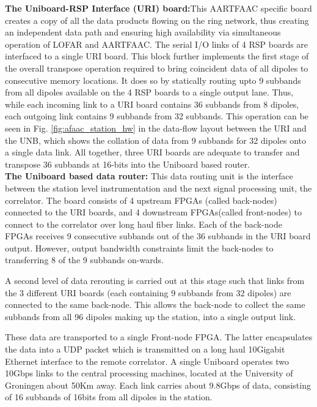 \documentclass{ws-jai}
\begin{document}
\noindent  \textbf  {The  Uniboard-RSP   Interface  (URI)  board:}This  AARTFAAC
specific board  creates a  copy of  all the  data products  flowing on  the ring
network, thus creating  an independent data path and  ensuring high availability
via simultaneous operation of LOFAR and AARTFAAC.  The serial I/O links of 4 RSP
boards are interfaced to a single  URI board.  This block further implements the
first stage of the overall transpose operation required to bring coincident data
of  all dipoles  to  consecutive memory  locations.  It  does  so by  statically
routing upto  9 subbands from  all dipoles  available on the  4 RSP boards  to a
single output lane.  Thus, while each incoming  link to a URI  board contains 36
subbands  from  8 dipoles,  each  outgoing  link  contains  9 subbands  from  32
subbands.  This operation can be seen in Fig.  \ref{fig:afaac_station_hw} in the
data-flow layout between the URI and the  UNB, which shows the collation of data
from 9 subbands for 32 dipoles onto a single data link.  All together, three URI
boards are  adequate to transfer and  transpose 36 subbands at  16-bits into the
Uniboard based router.\\

\noindent \textbf  {The Uniboard based data  router:} This data routing  unit is
the  interface between  the station  level instrumentation  and the  next signal
processing unit, the correlator. The board  consists of 4 upstream FPGAs (called
back-nodes)  connected  to   the  URI  boards,  and   4  downstream  FPGAs(called
front-nodes) to  connect to the correlator  over long haul fiber  links.  Each of
the back-node FPGAs receives 9 consecutive subbands out of the 36 subbands in the
URI board output.  However, output bandwidth constraints limit  the back-nodes to
transferring 8 of the 9 subbands on-wards.

A second level  of data rerouting is  carried out at this stage  such that links
from the 3 different URI boards (each containing 9 subbands from 32 dipoles) are
connected to  the same back-node.  This allows the  back-node to collect  the same
subbands from all 96  dipoles making up the station, into  a single output link.

These data are transported to a  single Front-node FPGA.  The latter encapsulates
the  data into  a UDP  packet  which is  transmitted  on a  long haul  10Gigabit
Ethernet interface  to the  remote correlator.  A  single Uniboard  operates two
10Gbps links  to the central processing  machines, located at the  University of
Groningen about 50Km away.  Each link  carries about 9.8Gbps of data, consisting
of 16 subbands of 16bits from all dipoles in the station.\\
\end{document}

